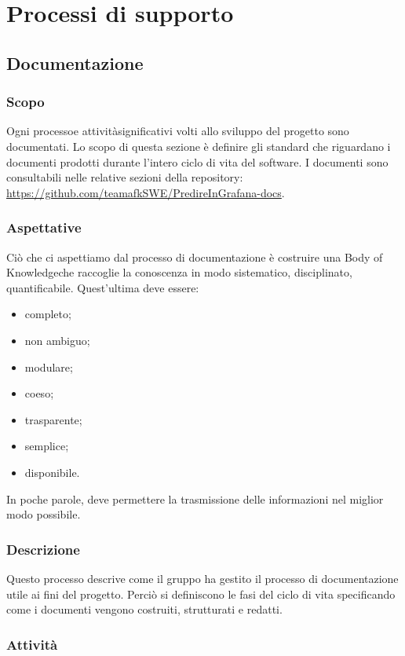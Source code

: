 \section{Processi di supporto}
\subsection{Documentazione}
\subsubsection{Scopo}
Ogni processo\glo e attività\glo significativi volti allo sviluppo del progetto sono documentati. Lo scopo di questa sezione è definire gli standard che riguardano i documenti prodotti durante l'intero ciclo di vita del software. I documenti sono consultabili nelle relative sezioni della repository\glo: \url{https://github.com/teamafkSWE/PredireInGrafana-docs}. 		

\subsubsection{Aspettative}
Ciò che ci aspettiamo dal processo di documentazione è costruire una Body of Knowledge\glo che raccoglie la conoscenza in modo sistematico, disciplinato, quantificabile. Quest'ultima deve essere: \begin{itemize}
\item completo;
\item non ambiguo;
\item modulare;
\item coeso;
\item trasparente;
\item semplice;
\item disponibile.
\end{itemize}
In poche parole, deve permettere la trasmissione delle informazioni nel miglior modo possibile.
\subsubsection{Descrizione}
Questo processo descrive come il gruppo ha gestito il processo di documentazione utile ai fini del progetto. Perciò si definiscono le fasi del ciclo di vita specificando come i documenti vengono costruiti, strutturati e redatti.

\subsubsection{Attività}
